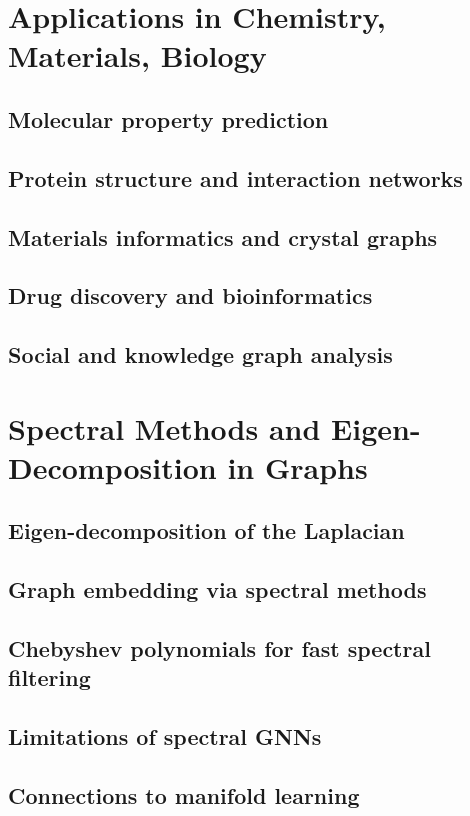 \section{Applications in Chemistry, Materials, Biology}
\subsection{Molecular property prediction}
\subsection{Protein structure and interaction networks}
\subsection{Materials informatics and crystal graphs}
\subsection{Drug discovery and bioinformatics}
\subsection{Social and knowledge graph analysis}

\section{Spectral Methods and Eigen-Decomposition in Graphs}
\subsection{Eigen-decomposition of the Laplacian}
\subsection{Graph embedding via spectral methods}
\subsection{Chebyshev polynomials for fast spectral filtering}
\subsection{Limitations of spectral GNNs}
\subsection{Connections to manifold learning}

